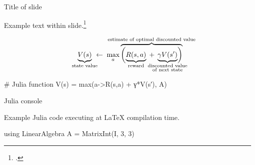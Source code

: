 \begin{frame}[fragile]{Title of slide} %

Example text within slide.\footcite{Kochenderfer2019}

\begin{equation*}
\underbrace{V(s)}_{\text{state value}} \!\!\! \leftarrow \;
\max\limits_a \overbrace{\biggl(
\underbrace{R(s,a)}_{\text{reward}} \; + \;
\underbrace{\gamma V(s^\prime)}_{\mathclap{\substack{\text{discounted value} \\ \text{of next state}}}}
\biggr)}^{\mathclap{\text{estimate of optimal discounted value}}}
\end{equation*}

\begin{algorithm}
\begin{juliaverbatim}
# Julia function
V(s) = max(a->R(s,a) + γ*V(s′), A)
\end{juliaverbatim}
\end{algorithm}

\end{frame}



\begin{frame}[fragile]{Julia console}

Example Julia code executing at LaTeX compilation time. %

\begin{juliaconsole}
using LinearAlgebra
A = Matrix{Int}(I, 3, 3)
\end{juliaconsole}

\end{frame}



